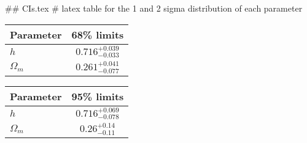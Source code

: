 ## CIs.tex
# latex table for the 1 and 2 sigma distribution of each parameter

\begin{tabular} { l  c}
 Parameter &  68\% limits\\
\hline
{\boldmath$h              $} & $0.716^{+0.039}_{-0.033}   $\\
{\boldmath$\Omega_m       $} & $0.261^{+0.041}_{-0.077}   $\\
\hline
\end{tabular}

\begin{tabular} { l  c}
 Parameter &  95\% limits\\
\hline
{\boldmath$h              $} & $0.716^{+0.069}_{-0.078}   $\\
{\boldmath$\Omega_m       $} & $0.26^{+0.14}_{-0.11}      $\\
\hline
\end{tabular}
